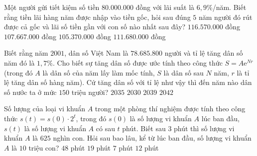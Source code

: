 \begin{ex}%
	Một người gửi tiết kiệm số tiền $80.000.000$ đồng với lãi suất là $6{,}9$\%/năm. Biết rằng tiền lãi hàng năm được nhập vào tiền gốc, hỏi sau đúng $5$ năm người đó rút được cả gốc và lãi số tiền gần với con số nào nhất sau đây?
	\choice
	{$116.570.000$ đồng}
	{$107.667.000$ đồng}
	{$105.370.000$ đồng}
	{\True $111.680.000$ đồng}
\end{ex}
\begin{ex}%
	Biết rằng năm $2001$, dân số Việt Nam là $78.685.800$ người và tỉ lệ tăng dân số năm đó là $1{,}7\%$. Cho biết sự tăng dân số được ước tính theo công thức $S=A\mathrm{e}^{Nr}$ (trong đó $A$ là dân số của năm lấy làm mốc tính, $S$ là dân số sau $N$ năm, $r$ là tỉ lệ tăng dân số hàng năm). Cứ tăng dân số với tỉ lệ như vậy thì đến năm nào dân số nước ta ở mức $150$ triệu người?
	\choice
	{$2035$}
	{$2030$}
	{\True $2039$}
	{$2042$}
\end{ex}
\begin{ex}%
	Số lượng của loại vi khuẩn $A$ trong một phòng thí nghiệm được tính theo công thức $s(t)=s(0)\cdot 2^t$, trong đó $s(0)$ là số lượng vi khuẩn $A$ lúc ban đầu, $s(t)$ là số lượng vi khuẩn $A$ có sau $t$ phút. Biết sau $3$ phút thì số lượng vi khuẩn $A$ là $625$ nghìn con. Hỏi sau bao lâu, kể từ lúc ban đầu, số lượng vi khuẩn $A$ là $10$ triệu con?
	\choice
	{$48$ phút}
	{$19$ phút}
	{\True $7$ phút}
	{$12$ phút}
\end{ex}
